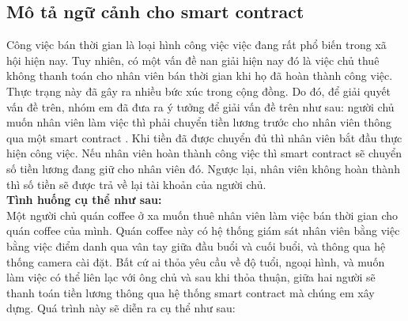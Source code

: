 \documentclass[12pt,a4paper,oneside]{article}
\begin{document}
\subsection{Mô tả ngữ cảnh cho smart contract} \label{1.3}
Công việc bán thời gian là loại hình công việc việc đang rất phổ biến trong xã hội hiện nay. Tuy nhiên, có một vấn đề nan giải hiện nay đó là việc chủ thuê không thanh toán cho nhân viên bán thời gian khi họ đã hoàn thành công việc. Thực trạng này đã gây ra nhiều bức xúc trong cộng đồng.
Do đó, để giải quyết vấn đề trên, nhóm em đã đưa ra ý tưởng để giải vấn đề trên như sau: người chủ muốn nhân viên làm việc thì phải chuyển tiền lương trước cho nhân viên thông qua một smart contract .
Khi tiền đã được chuyển đủ  thì nhân viên bắt đầu thực hiện công việc. Nếu nhân viên hoàn thành công việc thì smart contract sẽ chuyển số tiền lương đang giữ cho nhân viên đó. Ngược lại, nhân viên không hoàn thành thì số tiền sẽ được trả về lại tài khoản của người chủ.
\\ \textbf{ Tình huống cụ thể như sau:} \\ 
Một người chủ quán coffee ở xa muốn thuê nhân viên làm việc bán thời gian cho quán coffee của mình. Quán coffee này có hệ thống giám sát nhân viên bằng việc bằng việc điểm danh qua vân tay giữa đầu buổi và cuối buổi, và thông qua hệ thống camera cài đặt. Bất cứ ai thỏa yêu cầu về độ tuổi, ngoại hình, và muốn làm việc có thể liên lạc với ông chủ và sau khi thỏa thuận, giữa hai người sẽ thanh toán tiền lương thông qua hệ thống smart contract mà chúng em xây dựng. Quá trình này sẽ diễn ra cụ thể như sau: 
\end{document}
